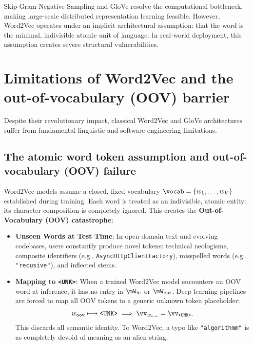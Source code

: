 \documentclass[../../main.tex]{subfiles}
\begin{document}
Skip-Gram Negative Sampling and GloVe resolve the computational bottleneck, making large-scale distributed representation learning feasible. However, Word2Vec operates under an implicit architectural assumption: that the word is the minimal, indivisible atomic unit of language. In real-world deployment, this assumption creates severe structural vulnerabilities.

\section{Limitations of Word2Vec and the out-of-vocabulary (OOV) barrier}
\label{sec:word2vec_limitations}

Despite their revolutionary impact, classical Word2Vec and GloVe architectures suffer from fundamental linguistic and software engineering limitations.

\subsection{The atomic word token assumption and out-of-vocabulary (OOV) failure}
\label{subsec:oov_barrier}

Word2Vec models assume a closed, fixed vocabulary $\vocab = \{w_1, \dots, w_V\}$ established during training. Each word is treated as an indivisible, atomic entity: its character composition is completely ignored. This creates the \textbf{Out-of-Vocabulary (OOV) catastrophe}:
\begin{itemize}
    \item \textbf{Unseen Words at Test Time}: In open-domain text and evolving codebases, users constantly produce novel tokens: technical neologisms, composite identifiers (e.g., \texttt{AsyncHttpClientFactory}), misspelled words (e.g., \texttt{"recusive"}), and inflected stems.
    \item \textbf{Mapping to \texttt{<UNK>}}: When a trained Word2Vec model encounters an OOV word at inference, it has no entry in $\mW_{\text{in}}$ or $\mW_{\text{out}}$. Deep learning pipelines are forced to map all OOV tokens to a generic unknown token placeholder:
    \begin{equation}
    \label{eq:unk_collapse}
    w_{\text{oov}} \longmapsto \text{\texttt{<UNK>}} \implies \vv_{w_{\text{oov}}} = \vv_{\text{\texttt{<UNK>}}}.
    \end{equation}
    This discards all semantic identity. To Word2Vec, a typo like \texttt{"algorithmm"} is as completely devoid of meaning as an alien string.
\end{itemize}
\end{document}

